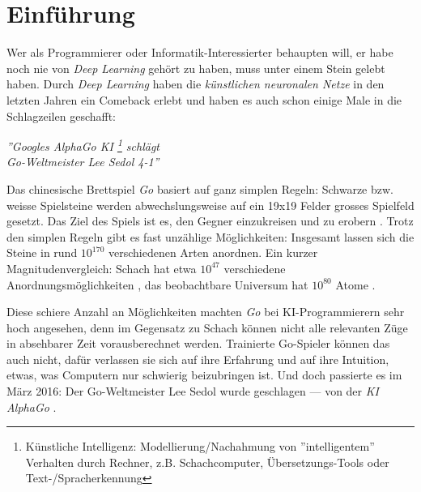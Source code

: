 \section{Einführung}

Wer als Programmierer oder Informatik-Interessierter behaupten will, er habe noch nie von \textit{Deep Learning} gehört zu haben, muss unter einem Stein gelebt haben. Durch \textit{Deep Learning} haben die \textit{künstlichen neuronalen Netze} in den letzten Jahren ein Comeback erlebt und haben es auch schon einige Male in die Schlagzeilen geschafft:

\begin{center}
	{\LARGE \textit{''Googles AlphaGo KI \footnote{Künstliche Intelligenz: Modellierung/Nachahmung von ''intelligentem'' Verhalten durch Rechner, z.B. Schachcomputer, Übersetzungs-Tools oder Text-/Spracherkennung} schlägt}\\}
	\vspace{0.5cm}
	{\LARGE \textit{Go-Weltmeister Lee Sedol 4-1''}}\cite{theguardian}
\end{center}

\vspace{0.3cm}

\begin{minipage}{13.5cm}
Das chinesische Brettspiel \textit{Go} basiert auf ganz simplen Regeln: Schwarze bzw. weisse Spielsteine werden abwechslungsweise auf ein 19x19 Felder grosses Spielfeld gesetzt. Das Ziel des Spiels ist es, den Gegner einzukreisen und zu erobern \cite{howtogo}. Trotz den simplen Regeln gibt es fast unzählige Möglichkeiten: Insgesamt lassen sich die Steine in rund $10^{170}$ verschiedenen Arten anordnen. Ein kurzer Magnitudenvergleich: Schach hat etwa $10^{47}$ verschiedene Anordnungsmöglichkeiten \cite{shannon}, das beobachtbare Universum hat $10^{80}$ Atome \cite{atoms}.

Diese schiere Anzahl an Möglichkeiten machten \textit{Go} bei KI-Programmierern sehr hoch angesehen, denn im Gegensatz zu Schach können nicht alle relevanten Züge in absehbarer Zeit vorausberechnet werden\footnotemark. Trainierte Go-Spieler können das auch nicht, dafür verlassen sie sich auf ihre Erfahrung und auf ihre Intuition, etwas, was Computern nur schwierig beizubringen ist. Und doch passierte es im März 2016: Der Go-Weltmeister Lee Sedol wurde geschlagen --- von der \textit{KI AlphaGo} \cite{alphago}.
\end{minipage}


